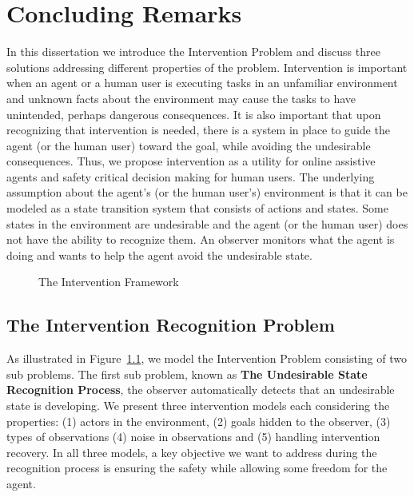 \chapter{Concluding Remarks}
In this dissertation we introduce the Intervention Problem and discuss three solutions addressing different properties of the problem.
Intervention is important when an agent or a human user is executing tasks in an unfamiliar environment and unknown facts about the environment may cause the tasks to have unintended, perhaps dangerous consequences.
It is also important that upon recognizing that intervention is needed, there is a system in place to guide the agent (or the human user) toward the goal, while avoiding the undesirable consequences.
Thus, we propose intervention as a utility for online assistive agents and safety critical decision making for human users.
The underlying assumption about the agent's (or the human user's) environment is that it can be modeled as a state transition system that consists of actions and states.
Some states in the environment are undesirable and the agent (or the human user) does not have the ability to recognize them.
An observer monitors what the agent is doing and wants to help the agent avoid the undesirable state.

\begin{figure}[tpb]
   \caption{The Intervention Framework}
\label{fig:summary}
\end{figure}

\section{The Intervention Recognition Problem}
As illustrated in Figure~\ref{fig:summary}, we model the Intervention Problem consisting of two sub problems.
The first sub problem, known as \textbf{The Undesirable State Recognition Process}, the observer automatically detects that an undesirable state is developing.
We present three intervention models each considering the properties: (1) actors in the environment, (2) goals hidden to the observer, (3) types of observations (4) noise in observations and (5) handling intervention recovery.
In all three models, a key objective we want to address during the recognition process is ensuring the safety while allowing some freedom for the agent.

